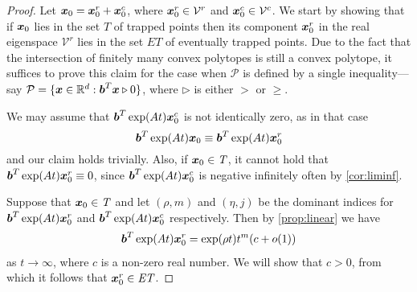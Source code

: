 \begin{proof}

  Let
  $\boldsymbol{x}_{0}=\boldsymbol{x}_{0}^{r}+\boldsymbol{x}_{0}^{c}$,
  where $\boldsymbol{x}_{0}^{r}\in \mathcal{V}^{r}$ and
  $\boldsymbol{x}_{0}^{c}\in \mathcal{V}^{c}$. We start by showing
  that if $\boldsymbol{x}_{0}$ lies in the set $T$ of trapped points
  then its component $\boldsymbol{x}_{0}^{r}$ in the real eigenspace
  $\mathcal{V}^{r}$ lies in the set $\mathit{ET}$ of eventually
  trapped points.
Due to the
fact that the intersection of finitely many convex polytopes is still
a convex polytope, it suffices to prove this claim for the case when
  $\mathcal{P}$ is defined by a single inequality---say
  $\mathcal{P}=\lbrace \boldsymbol{x}\in\mathbb{R}^{d}:
  \boldsymbol{b}^{T}\boldsymbol{x}\triangleright 0\rbrace$, where
  $\triangleright$ is either $>$ or $\geq$.

  We may assume that
  $\boldsymbol{b}^{T} \exp(At) \boldsymbol{x}_{0}^{c}$ is not identically
  zero, as in that case
  \begin{equation*}
  \boldsymbol{b}^{T} \exp(At)\boldsymbol{x}_{0} \equiv
  \boldsymbol{b}^{T} \exp(At)\boldsymbol{x}_{0}^{r}
  \end{equation*}
  and our claim holds trivially.
  Also, if $\boldsymbol{x}_{0}\in\mathit{T}$, it cannot hold that
  $\boldsymbol{b}^{T} \exp(At) \boldsymbol{x}_{0}^{r} \equiv 0$, since
  $\boldsymbol{b}^{T} \exp(At) \boldsymbol{x}_{0}^{c}$ is negative
  infinitely often by \cref{cor:liminf}.

  Suppose that $\boldsymbol{x}_{0}\in\mathit{T}$ and let $(\rho,m)$
  and $(\eta,j)$ be the dominant indices for
  $\boldsymbol{b}^{T} \exp(At) \boldsymbol{x}_{0}^{r}$ and
  $\boldsymbol{b}^{T} \exp(At) \boldsymbol{x}_{0}^{c}$ respectively.
Then by \cref{prop:linear} we have
\begin{gather}
\myvector{b}^{T} \exp(At) \myvector{x}_{0}^{r} = \exp(\rho t)t^m (c
  + o(1))
\label{eq:real}
\end{gather}
 as $t \rightarrow \infty$, where $c$ is a non-zero real
number.  We will show that $c>0$, from which it follows  that
$\boldsymbol{x}_{0}^{r} \in \mathit{ET}$.


\end{proof}
